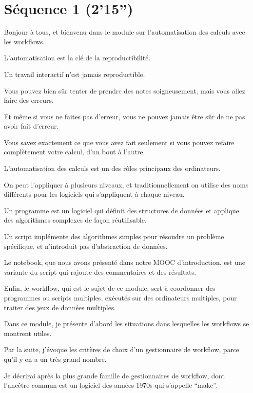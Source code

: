 \documentclass[12pt]{article}
\begin{document}
\section*{Séquence 1 (2'15'')}

Bonjour à tous, et bienvenu dans le module sur l'automatisation des
calculs avec les workflows.

\newpage

L'automatisation est la clé de la reproductibilité.

Un travail interactif n'est jamais reproductible.

Vous pouvez bien sûr tenter de prendre des notes soigneusement, mais
vous allez faire des erreurs.

Et même si vous ne faites pas d'erreur, vous ne pouvez jamais être sûr
de ne pas avoir fait d'erreur.

Vous savez exactement ce que vous avez fait seulement si vous pouvez
refaire complètement votre calcul, d'un bout à l'autre.

\newpage

L'automatisation des calculs est un des rôles principaux des ordinateurs.

On peut l'appliquer à plusieurs niveaux, et traditionnellement on
utilise des noms différents pour les logiciels qui s'appliquent à
chaque niveau.

Un programme est un logiciel qui définit des structures de données et
applique des algorithmes complexes de façon réutilisable.

Un script implémente des algorithmes simples pour résoudre un problème
spécifique, et n'introduit pas d'abstraction de données.

Le notebook, que nous avons présenté dans notre MOOC d'introduction,
est une variante du script qui rajoute des commentaires et des
résultats.

Enfin, le workflow, qui est le sujet de ce module, sert à coordonner
des programmes ou scripts multiples, exécutés sur des ordinateurs
multiples, pour traiter des jeux de données multiples.

\newpage

Dans ce module, je présente d'abord les situations dans lesquelles
les workflows se montrent utiles.

Par la suite, j'évoque les critères de choix d'un gestionnaire de
workflow, parce qu'il y en a un très grand nombre.

Je décrirai après la plus grande famille de gestionnaires de workflow,
dont l'ancêtre commun est un logiciel des années 1970s qui s'appelle
``make''.
\end{document}
